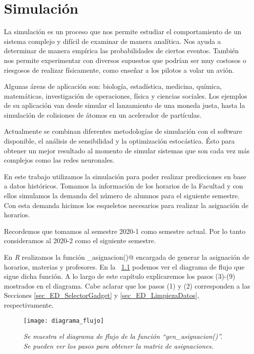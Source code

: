 \chapter{Simulación}

La simulación es un proceso que nos permite estudiar el comportamiento de un sistema complejo y difícil de examinar de manera analítica. Nos ayuda a determinar de manera empírica las probabilidades de ciertos eventos. También nos permite experimentar con diversos supuestos que podrían ser muy costosos o riesgosos de realizar físicamente, como enseñar a los pilotos a volar un avión.

Algunas áreas de aplicación son: biología, estadística, medicina, química, matemáticas, investigación de operaciones, física y ciencias sociales. Los ejemplos de su aplicación van desde simular el lanzamiento de una moneda justa, hasta la simulación de colisiones de átomos en un acelerador de partículas.

Actualmente se combinan diferentes metodologías de simulación con el software disponible, el análisis de sensibilidad y la optimización estocástica. Ésto para obtener un mejor resultado al momento de simular sistemas que son cada vez más complejos como las redes neuronales.

En este trabajo utilizamos la simulación para poder realizar predicciones en base a datos históricos. Tomamos la información de los horarios de la Facultad y con ellos simulamos la demanda del número de alumnos para el siguiente semestre. Con esta demanda hicimos los esqueletos necesarios para realizar la asignación de horarios.

Recordemos que tomamos al semestre 2020-1 como semestre actual. Por lo tanto consideramos al 2020-2 como el siguiente semestre.

En \textit{R} realizamos la función \verb@gen_asignacion()@ encargada de generar la asignación de horarios, materias y profesores. En la \figurename{~\ref{DF_genAsig}} podemos ver el diagrama de flujo que sigue dicha función. A lo largo de este capítulo explicaremos los pasos (3)-(9) mostrados en el diagrama. Cabe aclarar que los pasos (1) y (2) corresponden a las Secciones \ref{sec_ED_SelectorGadget} y \ref{sec_ED_LimpiezaDatos}, respectivamente.

\begin{figure}[H]
\centering
\texttt{[image: diagrama\_flujo]} %
\caption[\textit{Diagrama de flujo de la función ``gen\_asignacion()''}]{\textit{Se muestra el diagrama de flujo de la función ``gen\_asignacion()''. Se pueden ver los pasos para obtener la matriz de asignaciones.}}\label{DF_genAsig}
\end{figure}



